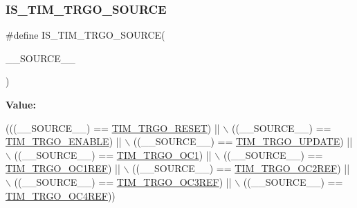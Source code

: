 \subsubsection{\texorpdfstring{I\+S\+\_\+\+T\+I\+M\+\_\+\+T\+R\+G\+O\+\_\+\+S\+O\+U\+R\+CE}{IS\_TIM\_TRGO\_SOURCE}}
{\footnotesize\ttfamily \#define I\+S\+\_\+\+T\+I\+M\+\_\+\+T\+R\+G\+O\+\_\+\+S\+O\+U\+R\+CE(\begin{DoxyParamCaption}\item[{}]{\+\_\+\+\_\+\+S\+O\+U\+R\+C\+E\+\_\+\+\_\+ }\end{DoxyParamCaption})}

{\bfseries Value\+:}
\begin{DoxyCode}
(((\_\_SOURCE\_\_) == \hyperlink{group___t_i_m___master___mode___selection_ga32a8e436f2c0818a657b0d3fcf4e872d}{TIM\_TRGO\_RESET})  || \(\backslash\)
                                        ((\_\_SOURCE\_\_) == \hyperlink{group___t_i_m___master___mode___selection_ga4ac300b0fd24d1e6532e5961680a39a9}{TIM\_TRGO\_ENABLE}) || \(\backslash\)
                                        ((\_\_SOURCE\_\_) == \hyperlink{group___t_i_m___master___mode___selection_ga27521aebd507e562fe7fba6dfc639a67}{TIM\_TRGO\_UPDATE}) || \(\backslash\)
                                        ((\_\_SOURCE\_\_) == \hyperlink{group___t_i_m___master___mode___selection_ga80aa9a9c41de509d99fc4cb492d6513f}{TIM\_TRGO\_OC1})    || \(\backslash\)
                                        ((\_\_SOURCE\_\_) == \hyperlink{group___t_i_m___master___mode___selection_gaed715aa7ec4ad0f7f5d82dde6d964178}{TIM\_TRGO\_OC1REF}) || \(\backslash\)
                                        ((\_\_SOURCE\_\_) == \hyperlink{group___t_i_m___master___mode___selection_gaaedc4b3f4c5c3c8b45a2cf1b73e33c0a}{TIM\_TRGO\_OC2REF}) || \(\backslash\)
                                        ((\_\_SOURCE\_\_) == \hyperlink{group___t_i_m___master___mode___selection_ga4bc4791f8b9560950d30078b96d08f55}{TIM\_TRGO\_OC3REF}) || \(\backslash\)
                                        ((\_\_SOURCE\_\_) == \hyperlink{group___t_i_m___master___mode___selection_ga7fe6228adec5d1b6f0a8ed8da111db4d}{TIM\_TRGO\_OC4REF}))
\end{DoxyCode}
\mbox{\label{group___t_i_m___private___macros_ga31d479d785a28d48bd66fdca38b48d91}} 
